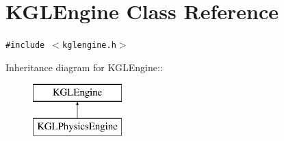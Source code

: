 \hypertarget{class_k_g_l_engine}{
\section{KGLEngine Class Reference}
\label{class_k_g_l_engine}
}
{\tt \#include $<$kglengine.h$>$}

Inheritance diagram for KGLEngine::\begin{figure}[H]
\begin{center}
\leavevmode
\includegraphics[height=2cm]{class_k_g_l_engine}
\end{center}
\end{figure}
